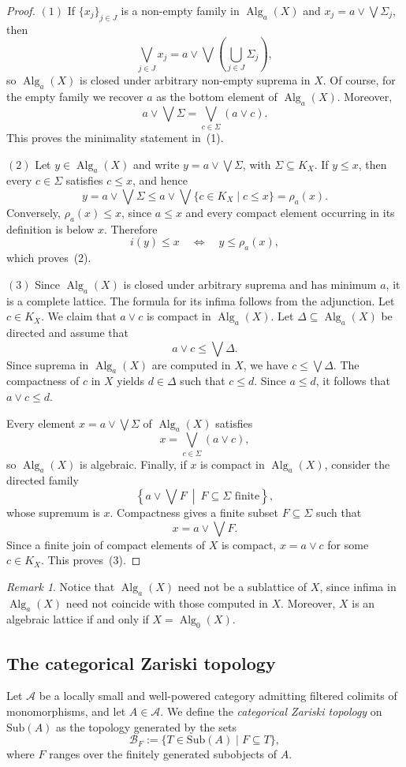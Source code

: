 \documentclass{amsproc}
\theoremstyle{definition}
\theoremstyle{plain}
\theoremstyle{remark}
\newtheorem{remark}[theorem]{Remark}
\numberwithin{equation}{section}
\newcommand{\Cal}[1]{{\mathcal #1}}
\newcommand{\sub}[1]{\mathrm{Sub} (#1)}
\newcommand{\Alg}{\operatorname{Alg}}
\begin{document}
\begin{proof}
$(1)$ If $\{x_j\}_{j\in J}$ is a non-empty family in $\Alg_a(X)$ and $x_j=a\vee\bigvee\Sigma_j$, then
$$
\bigvee_{j\in J}x_j
=
 a\vee\bigvee\left(\bigcup_{j\in J}\Sigma_j\right),
$$
so $\Alg_a(X)$ is closed under arbitrary non-empty suprema in $X$. Of course, for the empty family we recover $a$ as the bottom element of $\Alg_a(X)$. Moreover,
$$
a\vee\bigvee\Sigma
=
\bigvee_{c\in\Sigma}(a\vee c).
$$
This proves the minimality statement in~(1).

$(2)$ Let $y\in\Alg_a(X)$ and write $y=a\vee\bigvee\Sigma$, with $\Sigma\subseteq K_X$. If $y\leq x$, then every $c\in\Sigma$ satisfies $c\leq x$, and hence
$$
y=a\vee\bigvee\Sigma
\leq
 a\vee\bigvee\{c\in K_X\mid c\leq x\}
=
\rho_a(x).
$$
Conversely, $\rho_a(x)\leq x$, since $a\leq x$ and every compact element occurring in its definition is below $x$. Therefore
$$
i(y)\leq x
\quad\Longleftrightarrow\quad
y\leq\rho_a(x),
$$
which proves~(2).

$(3)$ Since $\Alg_a(X)$ is closed under arbitrary suprema and has minimum $a$, it is a complete lattice. The formula for its infima follows from the adjunction. Let $c\in K_X$. We claim that $a\vee c$ is compact in $\Alg_a(X)$. Let $\Delta\subseteq\Alg_a(X)$ be directed and assume that
$$
a\vee c\leq\bigvee\Delta.
$$
Since suprema in $\Alg_a(X)$ are computed in $X$, we have $c\leq\bigvee\Delta$. The compactness of $c$ in $X$ yields $d\in\Delta$ such that $c\leq d$. Since $a\leq d$, it follows that $a\vee c\leq d$.

Every element $x=a\vee\bigvee\Sigma$ of $\Alg_a(X)$ satisfies
$$
x=\bigvee_{c\in\Sigma}(a\vee c),
$$
so $\Alg_a(X)$ is algebraic. Finally, if $x$ is compact in $\Alg_a(X)$, consider the directed family
$$
\left\{a\vee\bigvee F\ \middle|\ F\subseteq\Sigma\text{ finite}\right\},
$$
whose supremum is $x$. Compactness gives a finite subset $F\subseteq\Sigma$ such that
$$
x=a\vee\bigvee F.
$$
Since a finite join of compact elements of $X$ is compact, $x=a\vee c$ for some $c\in K_X$. This proves~(3).
\end{proof}

\begin{remark}
Notice that $\Alg_a(X)$ need not be a sublattice of $X$, since infima in $\Alg_a(X)$ need not coincide with those computed in $X$. Moreover, $X$ is an algebraic lattice if and only if $X=\Alg_0(X)$.
\end{remark}

\subsection{The categorical Zariski topology}
Let $\mathscr A$ be a locally small and well-powered category admitting filtered colimits of monomorphisms, and let $A\in\mathscr A$. We define the \emph{categorical Zariski topology} on $\sub A$ as the topology generated by the sets
$$
\Cal B_F:=\{T\in\sub A\mid F\subseteq T\},
$$
where $F$ ranges over the finitely generated subobjects of $A$.
\end{document}
